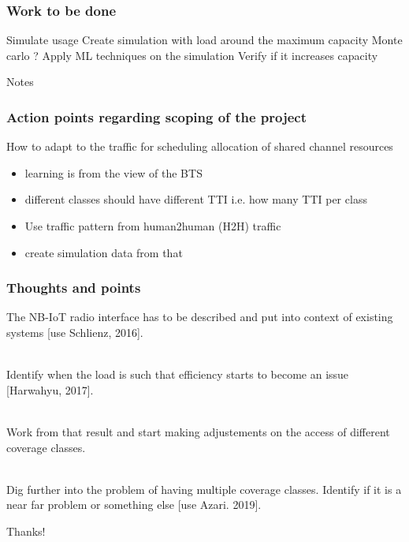 \documentclass[aspectratio=43,t]{beamer}
\begin{document}
\begin{frame}
\frametitle{Work to be done}

\begin{outline}
\1 Simulate usage
  \2 Create simulation with load around the maximum capacity
  \2 Monte carlo ?
\1 Apply ML techniques on the simulation
  \2 Verify if it increases capacity
\end{outline}

\end{frame}


\begin{frame}

\vspace{3.5cm}
\Huge{\hspace{3.4cm}Notes}

\end{frame}

\begin{frame}
\frametitle{Action points regarding scoping of the project}

How to adapt to the traffic for scheduling allocation of shared channel resources

\begin{itemize}\itemsep1em
 \justifying
 \item learning is from the view of the BTS
 \item different classes should have different TTI i.e. how many TTI per class
 \item Use traffic pattern from human2human (H2H) traffic
 \item create simulation data from that
\end{itemize}

\end{frame}


\begin{frame}
\frametitle{Thoughts and points}

The NB-IoT radio interface has to be described and put into context of existing systems [use Schlienz, 2016].

~\\

Identify when the load is such that efficiency starts to become an issue [Harwahyu, 2017].

~\\

Work from that result and start making adjustements on the access of different coverage classes.

~\\

Dig further into the problem of having multiple coverage classes. Identify if it is a near far problem or something else [use Azari. 2019].

\end{frame}


\begin{frame}

\vspace{3.5cm}
\Huge{\hspace{3.4cm}Thanks!}

\end{frame}
\end{document}
